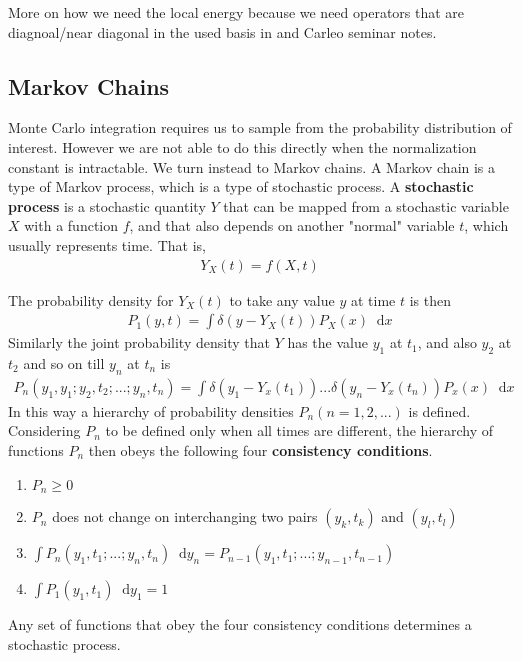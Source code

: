\documentclass[twoside,english]{uiofysmaster}
\newcommand*\dif{\mathop{}\!\mathrm{d}}
\begin{document}
More on how we need the local energy because we need operators that are diagnoal/near diagonal in the used basis in 
\cite{Umrigar1999} and Carleo seminar notes.






\subsection{Markov Chains}
\label{sec:MarkovChains}

Monte Carlo integration requires us to sample from the probability distribution of interest. However we are not able to do this directly when the normalization constant is intractable. We turn instead to Markov chains. A Markov chain is a type of Markov process, which is a type of stochastic process. A \textbf{stochastic process} is a stochastic quantity $Y$ that can be mapped from a stochastic variable $X$ with a function $f$, and that also depends on another "normal" variable $t$, which usually represents time. That is,
\begin{align}
	Y_X (t) = f(X,t)
\end{align}


The probability density for $Y_X(t)$ to take any value $y$ at time $t$ is then
\begin{align}
	P_1 (y, t) = \int \delta (y- Y_X (t)) P_X (x) \dif x
\end{align}
Similarly the joint probability density that $Y$ has the value $y_1$ at $t_1$, and also $y_2$ at $t_2$ and so on till $y_n$ at $t_n$ is
\begin{align}
	P_n (y_1, y_1; y_2, t_2; ...; y_n, t_n)
	= \int \delta (y_1 - Y_x (t_1)) ... \delta (y_n - Y_x (t_n)) P_x (x) \dif x
\end{align}
In this way a hierarchy of probability densities $P_n (n=1,2,...)$ is defined.
Considering $P_n$ to be defined only when all times are different, the hierarchy of functions $P_n$ then obeys the following four \textbf{consistency conditions}.
\begin{enumerate}
	\item $P_n \geq 0$
	\item $P_n$ does not change on interchanging two pairs $(y_k, t_k)$ and $(y_l, t_l)$
	\item $\int P_n (y_1, t_1; ...; y_n, t_n) \dif y_n = P_{n-1} (y_1, t_1; ...; y_{n-1}, t_{n-1}) $
	\item $\int P_1 (y_1, t_1) \dif y_1 = 1$ 
\end{enumerate}
Any set of functions that obey the four consistency conditions determines a stochastic process.
\end{document}
